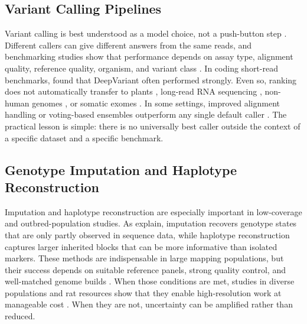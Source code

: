 \documentclass{article}
\begin{document}
\subsection{Variant Calling Pipelines}
Variant calling is best understood as a model choice, not a push-button step \parencite{zverinova2022variant}. Different callers can give different answers from the same reads, and benchmarking studies show that performance depends on assay type, alignment quality, reference quality, organism, and variant class \parencite{barbitoff2022systematic,majidian2023genomic}. In coding short-read benchmarks, \textcite{barbitoff2022systematic} found that DeepVariant often performed strongly. Even so, ranking does not automatically transfer to plants \parencite{schilbert2020comparison}, long-read RNA sequencing \parencite{de2023transformation}, non-human genomes \parencite{choi2025learning}, or somatic exomes \parencite{guille2025benchmarking,park2025accurate}. In some settings, improved alignment handling or voting-based ensembles outperform any single default caller \parencite{de2023transformation,guille2025benchmarking}. The practical lesson is simple: there is no universally best caller outside the context of a specific dataset and a specific benchmark.

\subsection{Genotype Imputation and Haplotype Reconstruction}
Imputation and haplotype reconstruction are especially important in low-coverage and outbred-population studies. As \textcite{lou2021beginner} explain, imputation recovers genotype states that are only partly observed in sequence data, while haplotype reconstruction captures larger inherited blocks that can be more informative than isolated markers. These methods are indispensable in large mapping populations, but their success depends on suitable reference panels, strong quality control, and well-matched genome builds \parencite{deng2022comparison,gileta2020adapting}. When those conditions are met, studies in diverse populations and rat resources show that they enable high-resolution work at manageable cost \parencite{liu2024accurate,johnson2023rattaca,chen2025cost,de2024revamped}. When they are not, uncertainty can be amplified rather than reduced.
\end{document}
